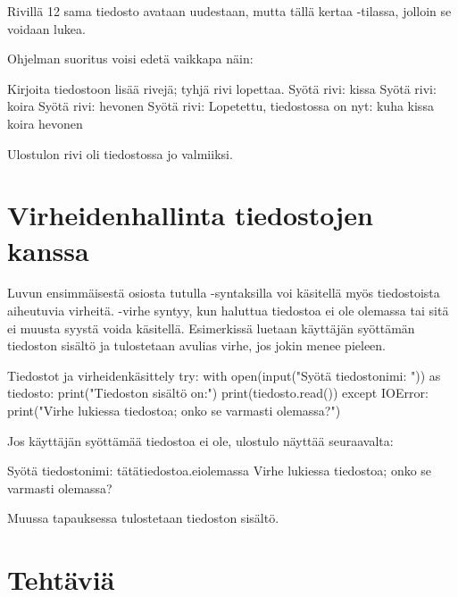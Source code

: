 Rivillä 12 sama tiedosto avataan uudestaan, mutta tällä kertaa -tilassa, jolloin se voidaan lukea.

Ohjelman suoritus voisi edetä vaikkapa näin:

\begin{output}
Kirjoita tiedostoon lisää rivejä; tyhjä rivi lopettaa.
Syötä rivi: kissa
Syötä rivi: koira
Syötä rivi: hevonen
Syötä rivi: 
Lopetettu, tiedostossa on nyt:
kuha
kissa
koira
hevonen
\end{output}

Ulostulon rivi  oli tiedostossa jo valmiiksi.

\section{Virheidenhallinta tiedostojen kanssa}

Luvun ensimmäisestä osiosta tutulla -syntaksilla voi käsitellä myös tiedostoista aiheutuvia virheitä. -virhe syntyy, kun haluttua tiedostoa ei ole olemassa tai sitä ei muusta syystä voida käsitellä. Esimerkissä luetaan käyttäjän syöttämän tiedoston sisältö ja tulostetaan avulias virhe, jos jokin menee pieleen.

\begin{example}{Tiedostot ja virheidenkäsittely}
try:
        with open(input("Syötä tiedostonimi: ")) as tiedosto:
                print("Tiedoston sisältö on:")
                print(tiedosto.read())
except IOError:
        print("Virhe lukiessa tiedostoa; onko se varmasti olemassa?")
\end{example}

Jos käyttäjän syöttämää tiedostoa ei ole, ulostulo näyttää seuraavalta:

\begin{output}
Syötä tiedostonimi: tätätiedostoa.eiolemassa
Virhe lukiessa tiedostoa; onko se varmasti olemassa?
\end{output}

Muussa tapauksessa tulostetaan tiedoston sisältö.

\section{Tehtäviä}

